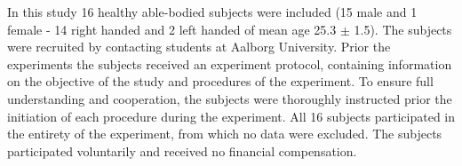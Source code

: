 In this study 16 healthy able-bodied subjects were included (15 male and 1 female - 14 right handed and 2 left handed of mean age 25.3 $\pm$ 1.5). The subjects were recruited by contacting students at Aalborg University. Prior the experiments the subjects received an experiment protocol, containing information on the objective of the study and procedures of the experiment. To ensure full understanding and cooperation, the subjects were thoroughly instructed prior the initiation of each procedure during the experiment. All 16 subjects participated in the entirety of the experiment, from which no data were excluded. The subjects participated voluntarily and received no financial compensation.